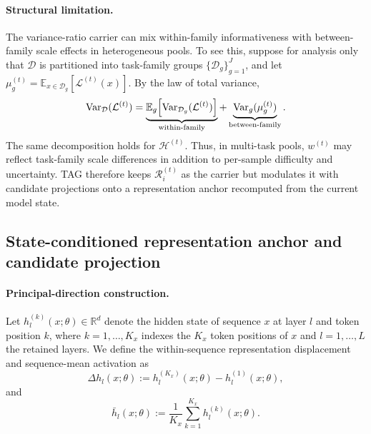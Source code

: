 \paragraph{Structural limitation.}
The variance-ratio carrier can mix within-family informativeness with
between-family scale effects in heterogeneous pools. To see this,
suppose for analysis only that \(\mathcal D\) is partitioned into
task-family groups \(\{\mathcal D_g\}_{g=1}^{J}\), and let
\(\mu_g^{(t)}=\mathbb E_{x\in\mathcal D_g}[\mathcal L^{(t)}(x)]\).
By the law of total variance,
\begin{equation}
  \operatorname{Var}_{\mathcal D}(\mathcal L^{(t)})
  =
  \underbrace{
  \mathbb E_g
  \!\left[
  \operatorname{Var}_{\mathcal D_g}(\mathcal L^{(t)})
  \right]
  }_{\text{\scriptsize within-family}}
  +
  \underbrace{
  \operatorname{Var}_g(\mu_g^{(t)})
  }_{\text{\scriptsize between-family}} .
  \label{eq:total-variance}
\end{equation}
The same decomposition holds for \(\mathcal H^{(t)}\). Thus, in
multi-task pools, \(w^{(t)}\) may reflect task-family scale differences
in addition to per-sample difficulty and uncertainty. \textsc{TAG}
therefore keeps \(\mathcal R_i^{(t)}\) as the carrier but modulates
it with candidate projections onto a representation anchor recomputed
from the current model state.


\subsection{State-conditioned representation anchor and candidate
projection}
\label{sec:representation-anchor}

\paragraph{Principal-direction construction.}
Let \(h_l^{(k)}(x;\theta)\in\mathbb R^d\) denote the hidden state of
sequence \(x\) at layer \(l\) and token position \(k\), where
\(k=1,\dots,K_x\) indexes the \(K_x\) token positions of \(x\) and
\(l=1,\dots,L\) the retained layers. We define the
within-sequence representation displacement and sequence-mean
activation as
\begin{equation}
  \Delta h_l(x;\theta)
  :=
  h_l^{(K_x)}(x;\theta)-h_l^{(1)}(x;\theta),
  \label{eq:delta}
\end{equation}
and
\begin{equation}
  \bar h_l(x;\theta)
  :=
  \frac{1}{K_x}\sum_{k=1}^{K_x} h_l^{(k)}(x;\theta).
  \label{eq:meanact}
\end{equation}


